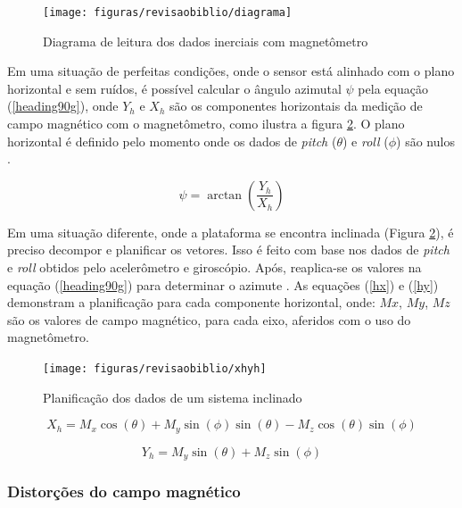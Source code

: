 \begin{figure}[!htb]
	\centering
	\caption{Diagrama de leitura dos dados inerciais com magnetômetro}
	\texttt{[image: figuras/revisaobiblio/diagrama]}
	\label{fig:magdiag}
\end{figure}


Em uma situação de perfeitas condições, onde o sensor está alinhado com o plano horizontal e sem ruídos, é possível calcular o ângulo azimutal $ \psi $ pela equação (\ref{heading90g}), onde $ Y_h $ e $ X_h $ são os componentes horizontais da medição de campo magnético com o magnetômetro, como ilustra a figura \ref{fig:planihxhy}. O plano horizontal é definido pelo momento onde os dados de \textit{pitch} ($ \theta $) e \textit{roll} ($ \phi $) são nulos \cite{838300}.

\begin{equation}
	\psi = \arctan\left(\dfrac{Y_h}{X_h}\right)
	\label{heading90g}
\end{equation}

Em uma situação diferente, onde a plataforma se encontra inclinada (Figura \ref{fig:planihxhy}), é preciso decompor e planificar os vetores. Isso é feito com base nos dados de \textit{pitch} e \textit{roll} obtidos pelo acelerômetro e giroscópio. Após, reaplica-se os valores na equação (\ref{heading90g}) para determinar o azimute \cite{carusoSAE}. As equações (\ref{hx}) e (\ref{hy}) demonstram a planificação para cada componente horizontal, onde: $ Mx $, $ My $, $ Mz $ são os valores de campo magnético, para cada eixo, aferidos com o uso do magnetômetro.

\begin{figure}[!htb]
	\centering
	\caption{Planificação dos dados de um sistema inclinado}
	\texttt{[image: figuras/revisaobiblio/xhyh]}
	\label{fig:planihxhy}
\end{figure}

\begin{equation}
	X_h = M_x\cos(\theta) + M_y\sin(\phi)\sin(\theta) - M_z\cos(\theta)\sin(\phi)
	\label{hx}
\end{equation}

\begin{equation}
	Y_h = M_y\sin(\theta) + M_z\sin(\phi)
	\label{hy}
\end{equation}

\subsubsection{Distorções do campo magnético}


